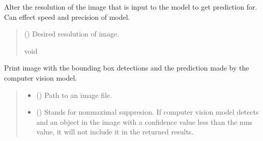 \documentclass[letterpaper,10pt,english]{sphinxmanual}
\begin{document}
\begin{fulllineitems}

\begin{fulllineitems}
\label{\detokenize{comp_viz.object_detection:comp_viz.object_detection.model.Model.set_inference_resolution}}
\pysigstartsignatures
{}
\pysigstopsignatures
\sphinxAtStartPar
Alter the resolution of the image that is input to the model to get prediction for. Can effect speed and precision of model.
\begin{quote}\begin{description}
\sphinxAtStartPar
{} () \textendash{} Desired resolution of image.

\sphinxAtStartPar
void

\end{description}\end{quote}

\end{fulllineitems}


\begin{fulllineitems}
\label{\detokenize{comp_viz.object_detection:comp_viz.object_detection.model.Model.show_image_prediction}}
\pysigstartsignatures
{}
\pysigstopsignatures
\sphinxAtStartPar
Print image with the bounding box detections and the prediction made by the computer vision model.
\begin{quote}\begin{description}
\begin{itemize}
\item {} 
\sphinxAtStartPar
{} () \textendash{} Path to an image file.

\item {} 
\sphinxAtStartPar
{} () \textendash{} Stands for non\sphinxhyphen{}maximal suppresion. If computer vision model detects and an 
object in the image with a confidence value less than the nms value, it 
will not include it in the returned results.


\end{itemize}
\end{description}
\end{quote}
\end{fulllineitems}
\end{fulllineitems}
\end{document}
